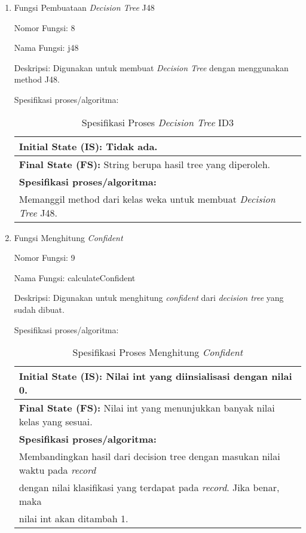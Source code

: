\begin{enumerate}
	
	\item Fungsi Pembuataan \textsl{Decision Tree} J48
	
	Nomor Fungsi: 8
	
	Nama Fungsi: j48
	
	Deskripsi: Digunakan untuk membuat \textsl{Decision Tree} dengan menggunakan method J48.
	
	Spesifikasi proses/algoritma:
	\begin{table}[h]
	\caption{Spesifikasi Proses \textsl{Decision Tree} ID3}
	\label{table:spesifikasiJ48}
	\centering
	\begin{tabular}{|l|}
	\hline
	\textbf{Initial State (IS): }Tidak ada.		 																			\\ \hline
	\textbf{Final State (FS): }String berupa hasil tree yang diperoleh.							\\ \hline
	\textbf{Spesifikasi proses/algoritma:}																 \\
	Memanggil method dari kelas weka untuk membuat \textsl{Decision Tree} J48. \\ \hline
	\end{tabular}
	\end{table}
	
	
	\item Fungsi Menghitung \textsl{Confident}
	
	Nomor Fungsi: 9
	
	Nama Fungsi: calculateConfident
	
	Deskripsi: Digunakan untuk menghitung \textsl{confident} dari \textsl{decision tree} yang sudah dibuat.
	
	Spesifikasi proses/algoritma:
	\begin{table}[h]
	\caption{Spesifikasi Proses Menghitung \textsl{Confident}}
	\label{table:spesifikasiConfident}
	\centering
	\begin{tabular}{|l|}
	\hline
	\textbf{Initial State (IS): }Nilai int yang diinsialisasi dengan nilai 0. 			\\ \hline
	\textbf{Final State (FS): }Nilai int yang menunjukkan banyak nilai kelas yang sesuai. \\ \hline
	\textbf{Spesifikasi proses/algoritma:}																 \\
	Membandingkan hasil dari decision tree dengan masukan nilai waktu pada \textsl{record} \\
	dengan nilai klasifikasi yang terdapat pada \textsl{record}. Jika benar, maka \\
	nilai int akan ditambah 1.\\ \hline
	\end{tabular}
	\end{table}
	

\end{enumerate}
